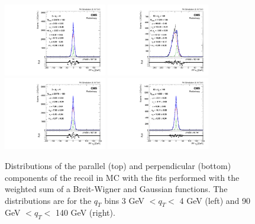 \begin{figure} [!htbp]
\begin{center}
\includegraphics[width=0.4\textwidth]{Figures/WBoson/Analysis/Correction/Recoil/Syst/SystBWGauss/MC/pfu1fit_2.pdf}
\includegraphics[width=0.4\textwidth]{Figures/WBoson/Analysis/Correction/Recoil/Syst/SystBWGauss/MC/pfu1fit_29.pdf} \\
\includegraphics[width=0.4\textwidth]{Figures/WBoson/Analysis/Correction/Recoil/Syst/SystBWGauss/MC/pfu2fit_2.pdf}
\includegraphics[width=0.4\textwidth]{Figures/WBoson/Analysis/Correction/Recoil/Syst/SystBWGauss/MC/pfu2fit_29.pdf}
\caption{Distributions of the parallel (top) and perpendicular (bottom) components of the recoil in MC with the fits performed with the weighted sum of a Breit-Wigner and Gaussian functions. The distributions are for the $q_{T}$ bins 3 GeV $< q_{T} <$ 4 GeV (left) and 90 GeV $< q_{T} <$ 140 GeV (right).}
\label{fig:figU12RecoilFitMC_BWGauss}
\end{center}
\end{figure}

